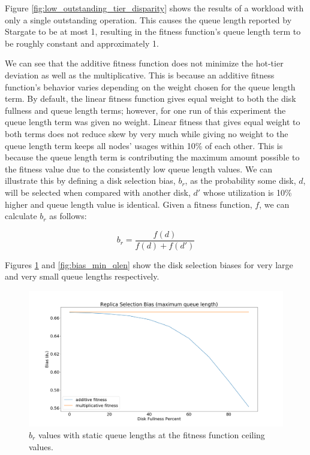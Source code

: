 \documentclass[12pt]{article}
\begin{document}
    Figure \ref{fig:low_outstanding_tier_disparity} shows the results of a
    workload with only a single outstanding operation. This causes the queue
    length reported by Stargate to be at most 1, resulting in the fitness
    function's queue length term to be roughly constant and approximately 1.
    
    We can see that the additive fitness function does not minimize the
    hot-tier deviation as well as the multiplicative. This is because an
    additive fitness function's behavior varies depending on the weight chosen
    for the queue length term. By default, the linear fitness function
    gives equal weight to both the disk fullness and queue length terms;
    however, for one run of this experiment the queue length term was given no
    weight. Linear fitness that gives equal weight to both terms does not
    reduce skew by very much while giving no weight to the queue length term
    keeps all nodes' usages within 10\% of each other. This is because the
    queue length term is contributing the maximum amount possible to the
    fitness value due to the consistently low queue length values. We can
    illustrate this by defining a disk selection bias, $b_r$, as the
    probability some disk, $d$, will be selected when compared with another
    disk, $d'$ whose utilization is 10\% higher and queue length value is
    identical. Given a fitness function, $f$, we can calculate $b_r$ as
    follows:

    \begin{equation}
      b_r = \frac{f(d)}{f(d) + f(d')}
    \end{equation}

    Figures \ref{fig:bias_max_qlen} and \ref{fig:bias_min_qlen} show the disk
    selection biases for very large and very small queue lengths respectively.

    \begin{figure}[htbp]
      \centering
      \includegraphics[scale=0.32]{images/replica_selection_bias_max_qlen.png} 
      \caption{$b_r$ values with static queue lengths at the fitness
               function ceiling values.}
      \label{fig:bias_max_qlen}
    \end{figure}
\end{document}
